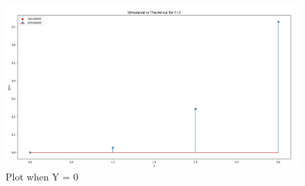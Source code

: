 \documentclass[journal,12pt,twocolumn]{IEEEtran}
\begin{document}
\begin{figure}[H]
    \centering
    \includegraphics[width=\columnwidth]{assignment2_plot2}
    \caption{Plot when Y = 0}
    \label{fig:3}
\end{figure}
\end{document}
